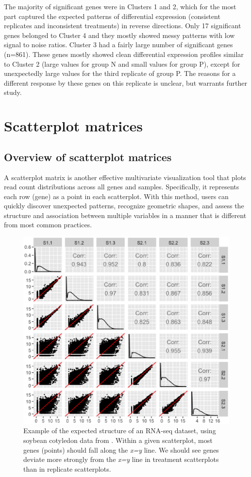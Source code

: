 \documentclass{bioinfo}
\begin{document}
The majority of significant genes were in Clusters 1 and 2, which for the most part captured the expected patterns of differential expression (consistent replicates and inconsistent treatments) in reverse directions. Only 17 significant genes belonged to Cluster 4 and they mostly showed messy patterns with low signal to noise ratios. Cluster 3 had a fairly large number of significant genes (n=861). These genes mostly showed clean differential expression profiles similar to Cluster 2 (large values for group N and small values for group P), except for unexpectedly large values for the third replicate of group P. The reasons for a different response by these genes on this replicate is unclear, but warrants further study.

\section{Scatterplot matrices}

\subsection{Overview of scatterplot matrices}

A scatterplot matrix is another effective multivariate visualization tool that plots read count distributions across all genes and samples. Specifically, it represents each row (gene) as a point in each scatterplot. With this method, users can quickly discover unexpected patterns, recognize geometric shapes, and assess the structure and association between multiple variables in a manner that is different from most common practices. 

\begin{figure}
\includegraphics[width=\linewidth]{sbCNSM.eps}
\caption{Example of the expected structure of an RNA-seq dataset, using soybean cotyledon data from \cite{Brown}. Within a given scatterplot, most genes (points) should fall along the \textit{x=y} line. We should see genes deviate more strongly from the \textit{x=y} line in treatment scatterplots than in replicate scatterplots. 
\label{sbCNSM}}
\end{figure}
\end{document}
